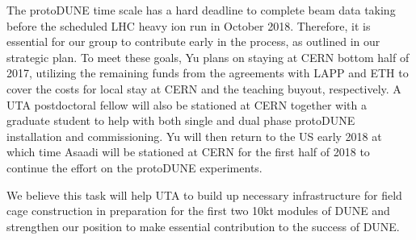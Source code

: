 The protoDUNE time scale has a hard deadline to complete beam data taking before the scheduled LHC heavy ion run in October 2018.  Therefore, it is essential for our group to contribute early in the process, as outlined in our strategic plan. To meet these goals, Yu plans on staying at CERN bottom half of 2017, utilizing the remaining funds from the agreements with LAPP and ETH to cover the costs for local stay at CERN and the teaching buyout, respectively.  A UTA postdoctoral fellow will also be stationed at CERN together with a graduate student to help with both single and dual phase protoDUNE installation and commissioning.   Yu will then return to the US early 2018 at which time Asaadi will be stationed at CERN for the first half of 2018 to continue the effort on the protoDUNE experiments.

We believe this task will help UTA to build up necessary infrastructure for field cage construction in preparation for the first two 10kt modules of DUNE and strengthen our position to make essential contribution to the success of DUNE.
